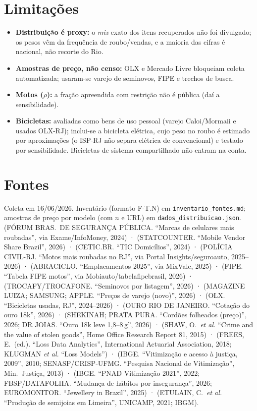\documentclass[11pt,a4paper]{article}
\begin{document}
\section*{Limitações}
\begin{itemize}\setlength\itemsep{0.1em}
  \item \textbf{Distribuição é proxy:} o \emph{mix} exato dos itens recuperados não foi divulgado;
        os pesos vêm da frequência de roubo/vendas, e a maioria das cifras é nacional, não recorte
        do Rio.
  \item \textbf{Amostras de preço, não censo:} OLX e Mercado Livre bloqueiam coleta automatizada;
        usaram-se varejo de seminovos, FIPE e trechos de busca.
  \item \textbf{Motos ($\rho$):} a fração apreendida com restrição não é pública (daí a
        sensibilidade).
  \item \textbf{Bicicletas:} avaliadas como bens de uso pessoal (varejo Caloi/Mormaii e usados
        OLX-RJ); inclui-se a bicicleta elétrica, cujo peso no roubo é estimado por aproximações (o
        ISP-RJ não separa elétrica de convencional) e testado por sensibilidade. Bicicletas de
        sistema compartilhado não entram na conta.
\end{itemize}

\section*{Fontes}
\small
\noindent Coleta em 16/06/2026. Inventário (formato F-T.N) em \texttt{inventario\_fontes.md};
amostras de preço por modelo (com $n$ e URL) em \texttt{dados\_distribuicao.json}.
(FÓRUM BRAS.\ DE SEGURANÇA PÚBLICA. ``Marcas de celulares mais roubadas'', via Exame/InfoMoney, 2024) ·
(STATCOUNTER. ``Mobile Vendor Share Brazil'', 2026) ·
(CETIC.BR. ``TIC Domicílios'', 2024) ·
(POLÍCIA CIVIL-RJ. ``Motos mais roubadas no RJ'', via Portal Insights/seguroauto, 2025--2026) ·
(ABRACICLO. ``Emplacamentos 2025'', via MixVale, 2025) ·
(FIPE. ``Tabela FIPE motos'', via Mobiauto/tabelafipebrasil, 2026) ·
(TROCAFY/TROCAFONE. ``Seminovos por listagem'', 2026) ·
(MAGAZINE LUIZA; SAMSUNG; APPLE. ``Preços de varejo (novo)'', 2026) ·
(OLX. ``Bicicletas usadas, RJ'', 2024--2026) ·
(OURO RIO DE JANEIRO. ``Cotação do ouro 18k'', 2026) ·
(SHEKINAH; PRATA PURA. ``Cordões folheados (preço)'', 2026; DR JOIAS. ``Ouro 18k leve 1,8--8\,g'', 2026) ·
(SHAW, O.\ \emph{et al.} ``Crime and the value of stolen goods'', Home Office Research Report 81, 2015) ·
(FREES, E.\ (ed.). ``Loss Data Analytics'', International Actuarial Association, 2018; KLUGMAN \emph{et al.} ``Loss Models'') ·
(IBGE. ``Vitimização e acesso à justiça, 2009'', 2010; SENASP/CRISP-UFMG. ``Pesquisa Nacional de Vitimização'', Min.\ Justiça, 2013) ·
(IBGE. ``PNAD Vitimização 2021'', 2022; FBSP/DATAFOLHA. ``Mudança de hábitos por insegurança'', 2026; EUROMONITOR. ``Jewellery in Brazil'', 2025) ·
(ETULAIN, C.\ \emph{et al.} ``Produção de semijoias em Limeira'', UNICAMP, 2021; IBGM).
\end{document}
